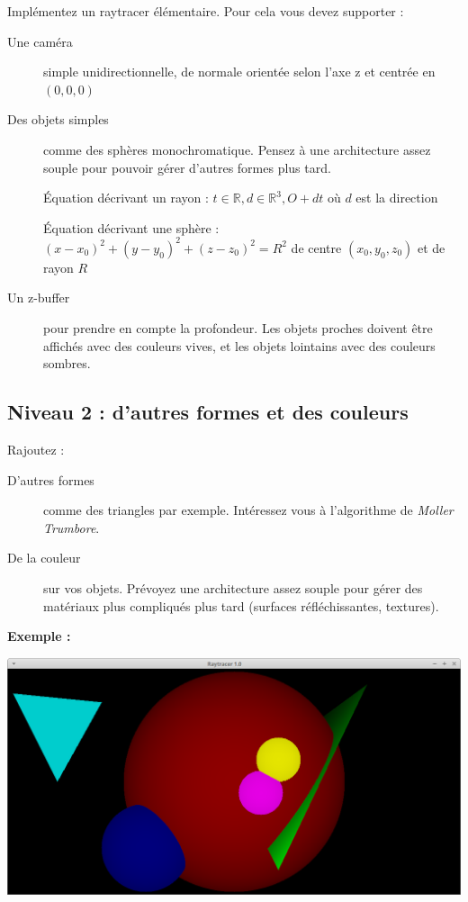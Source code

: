 \documentclass[a4paper, 11pt]{article}
\begin{document}
Implémentez un raytracer élémentaire. Pour cela vous devez supporter :  
  
\begin{description}
\item [Une caméra] simple unidirectionnelle, de normale orientée selon l'axe z et centrée en $(0, 0, 0)$
\item [Des objets simples] comme des sphères monochromatique. Pensez à une architecture assez souple pour pouvoir gérer d'autres formes plus tard. 

Équation décrivant un rayon : $ t\in \mathbb{R}, d\in \mathbb{R}^3, O + dt$ où $d$ est la direction
 
Équation décrivant une sphère : $(x - x_0)^2 + (y - y_0)^2 + (z - z_0)^2 = R^2$ de centre $(x_0, y_0, z_0)$ et de rayon $R$
\item [Un z-buffer] pour prendre en compte la profondeur. Les objets proches doivent être affichés avec des couleurs vives, et les objets lointains avec des couleurs sombres. 
  
\end{description}  

\subsection*{Niveau 2 : d'autres formes et des couleurs}

Rajoutez :

\begin{description}
\item [D'autres formes] comme des triangles par exemple. Intéressez vous à l'algorithme de \textit{Moller Trumbore}.  
\item [De la couleur] sur vos objets. Prévoyez une architecture assez souple pour gérer des matériaux plus compliqués plus tard (surfaces réfléchissantes, textures).  
  
\end{description}  

\textbf{Exemple :}
  
\begin{center}
\includegraphics[scale=0.2]{correct1.png} 
\end{center}
\end{document}
